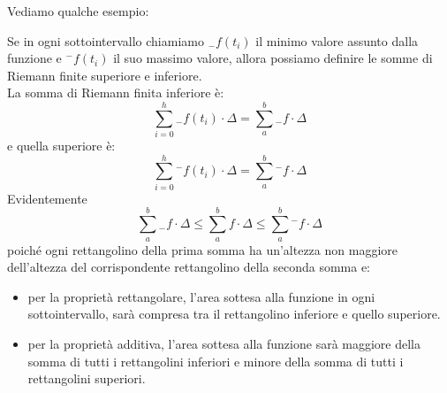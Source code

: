 Vediamo qualche esempio:
% 

Se in ogni sottointervallo chiamiamo \({}_{-}f(t_i)\) il minimo valore 
assunto dalla funzione e \({}^{-}f(t_i)\) il suo massimo valore, allora 
possiamo definire le somme di Riemann finite superiore e inferiore. \\
La somma di Riemann finita inferiore è: 
\[\sum_{i=0}^h{}_{-}f(t_i)\cdot\Delta = \sum_a^b{}_{-} f \cdot \Delta\] 
e quella superiore è: 
\[\sum_{i=0}^h {}^{-}f(t_i)\cdot\Delta = \sum_a^b {}^{-}f \cdot \Delta\]
Evidentemente 
\[\sum_a^b{}_{-}f \cdot \Delta \le \sum_a^b f \cdot \Delta \le 
\sum_a^b {}^{-}f \cdot \Delta\] 
poiché ogni rettangolino della prima somma ha un'altezza non maggiore 
dell'altezza del corrispondente rettangolino della seconda somma e:

\begin{itemize} [nosep]
 \item per la proprietà rettangolare, l'area sottesa alla funzione in ogni 
sottointervallo, sarà compresa tra il rettangolino inferiore e quello 
superiore.
 \item per la proprietà additiva, l'area sottesa alla funzione sarà maggiore 
della somma di tutti i rettangolini inferiori e minore della somma di tutti i 
rettangolini superiori.
\end{itemize}

\begin{minipage}{.49\textwidth}
\begin{inaccessibleblock} 
  \riemanninferiore
\end{inaccessibleblock}
\end{minipage}
\hfill
\begin{minipage}{.49\textwidth}
\begin{inaccessibleblock} 
  \riemannsuperiore
\end{inaccessibleblock}
\end{minipage}

